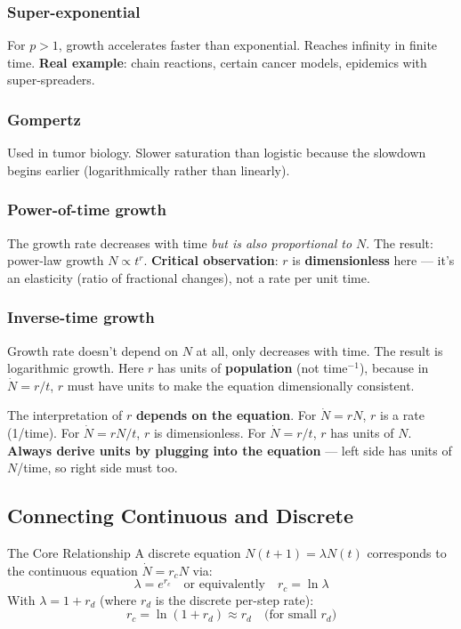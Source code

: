 \documentclass[11pt]{article}
\begin{document}
\subsubsection{Super-exponential} For $p > 1$, growth accelerates faster than exponential. Reaches infinity in finite time. \textbf{Real example}: chain reactions, certain cancer models, epidemics with super-spreaders.

\subsubsection{Gompertz} Used in tumor biology. Slower saturation than logistic because the slowdown begins earlier (logarithmically rather than linearly).

\subsubsection{Power-of-time growth} The growth rate decreases with time \emph{but is also proportional to $N$}. The result: power-law growth $N \propto t^r$. \textbf{Critical observation}: $r$ is \textbf{dimensionless} here --- it's an elasticity (ratio of fractional changes), not a rate per unit time.

\subsubsection{Inverse-time growth} Growth rate doesn't depend on $N$ at all, only decreases with time. The result is logarithmic growth. Here $r$ has units of \textbf{population} (not time$^{-1}$), because in $\dot N = r/t$, $r$ must have units to make the equation dimensionally consistent.

\begin{warnbox}
The interpretation of $r$ \textbf{depends on the equation}. For $\dot N = rN$, $r$ is a rate (1/time). For $\dot N = rN/t$, $r$ is dimensionless. For $\dot N = r/t$, $r$ has units of $N$. \textbf{Always derive units by plugging into the equation} --- left side has units of $N$/time, so right side must too.
\end{warnbox}

\subsection{Connecting Continuous and Discrete}

\begin{conceptbox}{The Core Relationship}
A discrete equation $N(t+1) = \lambda N(t)$ corresponds to the continuous equation $\dot N = r_c N$ via:
\[
\lambda = e^{r_c} \quad \text{or equivalently} \quad r_c = \ln \lambda
\]
With $\lambda = 1 + r_d$ (where $r_d$ is the discrete per-step rate):
\[
r_c = \ln(1 + r_d) \approx r_d \quad \text{(for small } r_d\text{)}
\]
\end{conceptbox}
\end{document}

